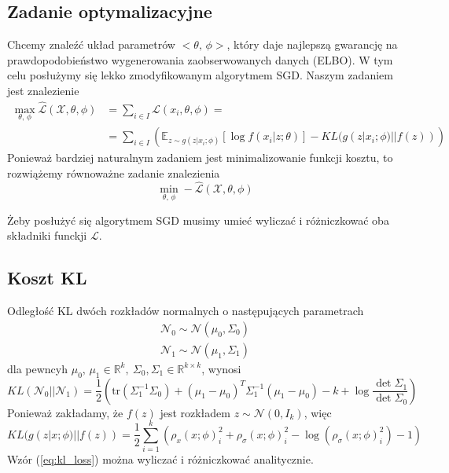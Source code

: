 \documentclass{iithesis}
\begin{document}
\subsection{Zadanie optymalizacyjne} \label{sec:optim_task}
Chcemy znaleźć układ parametrów $<\theta,\,\phi>$, który daje najlepszą
gwarancję na prawdopodobieństwo wygenerowania zaobserwowanych danych (ELBO).
W tym celu posłużymy się lekko zmodyfikowanym algorytmem SGD.
Naszym zadaniem jest znalezienie
\begin{equation}
\label{eq:loss_f}
\begin{split}
\max_{\theta,\,\phi} \hat{\mathcal{L}}(\mathcal{X}, \theta, \phi) &= \sum_{i \in I}\mathcal{L}(x_i, \theta, \phi) = \\
&=\sum_{i \in I} \left( \mathbb{E}_{z\sim g(z|x_i;\phi)}\left[\log f(x_i|z;\theta)\right] - KL(g(z|x_i;\phi) || f(z)) \right)
\end{split}
\end{equation}
Ponieważ bardziej naturalnym zadaniem jest minimalizowanie funkcji kosztu,
to rozwiążemy równoważne zadanie znalezienia
\begin{equation}
\min_{\theta,\,\phi} -\hat{\mathcal{L}}(\mathcal{X}, \theta, \phi)
\end{equation}

Żeby posłużyć się algorytmem SGD musimy umieć wyliczać i różniczkować
oba składniki funckji $\mathcal{L}$.

\subsection{Koszt KL}
Odległość KL dwóch rozkładów normalnych o następujących parametrach
\begin{equation*}
\begin{split}
\mathcal{N}_0 \sim \mathcal{N}(\mu_0, \Sigma_0) \\
\mathcal{N}_1 \sim \mathcal{N}(\mu_1, \Sigma_1)
\end{split}
\end{equation*}
dla pewncyh $\mu_0,\,\mu_1 \in \mathbb{R}^k,\ \Sigma_0, \Sigma_1 \in \mathbb{R}^{k \times k}$, wynosi
\begin{equation*}
KL(\mathcal{N}_0||\mathcal{N}_1) = \frac{1}{2} \left(\text{tr}(\Sigma_1^{-1}\Sigma_0)
+ (\mu_1-\mu_0)^T \Sigma_1^{-1} (\mu_1-\mu_0) -k + \log\frac{\det\Sigma_1}{\det\Sigma_0} \right)
\end{equation*}
Ponieważ zakładamy, że $f(z)$ jest rozkładem $z \sim \mathcal{N}(0, I_k)$, więc
\begin{equation}
KL(g(z|x;\phi) || f(z)) = \frac{1}{2}\sum_{i=1}^k
\left( \rho_x(x;\phi)_i^2 + \rho_\sigma(x;\phi)_i^2 - \log(\rho_\sigma(x;\phi)_i^2)-1 \right)
\label{eq:kl_loss}
\end{equation}
Wzór (\ref{eq:kl_loss}) można wyliczać i różniczkować analitycznie.
\end{document}
